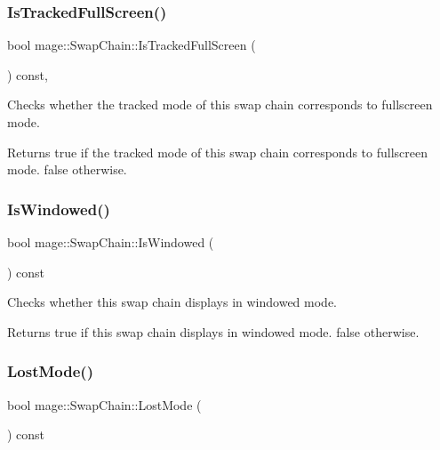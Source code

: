 \subsubsection{\texorpdfstring{Is\+Tracked\+Full\+Screen()}{IsTrackedFullScreen()}}
{\footnotesize\ttfamily bool mage\+::\+Swap\+Chain\+::\+Is\+Tracked\+Full\+Screen (\begin{DoxyParamCaption}{ }\end{DoxyParamCaption}) const\hspace{0.3cm}{\ttfamily [private]}, {\ttfamily [noexcept]}}

Checks whether the tracked mode of this swap chain corresponds to fullscreen mode.

\begin{DoxyReturn}{Returns}
{\ttfamily true} if the tracked mode of this swap chain corresponds to fullscreen mode. {\ttfamily false} otherwise. 
\end{DoxyReturn}
\hypertarget{classmage_1_1_swap_chain_a7cf71ec46d0af888b9b1daa890a54d39}{}\label{classmage_1_1_swap_chain_a7cf71ec46d0af888b9b1daa890a54d39} 
\subsubsection{\texorpdfstring{Is\+Windowed()}{IsWindowed()}}
{\footnotesize\ttfamily bool mage\+::\+Swap\+Chain\+::\+Is\+Windowed (\begin{DoxyParamCaption}{ }\end{DoxyParamCaption}) const\hspace{0.3cm}{\ttfamily [noexcept]}}

Checks whether this swap chain displays in windowed mode.

\begin{DoxyReturn}{Returns}
{\ttfamily true} if this swap chain displays in windowed mode. {\ttfamily false} otherwise. 
\end{DoxyReturn}
\hypertarget{classmage_1_1_swap_chain_aba3697d2b641b99f7e89fcc59613f89d}{}\label{classmage_1_1_swap_chain_aba3697d2b641b99f7e89fcc59613f89d} 
\subsubsection{\texorpdfstring{Lost\+Mode()}{LostMode()}}
{\footnotesize\ttfamily bool mage\+::\+Swap\+Chain\+::\+Lost\+Mode (\begin{DoxyParamCaption}{ }\end{DoxyParamCaption}) const\hspace{0.3cm}{\ttfamily [noexcept]}}

